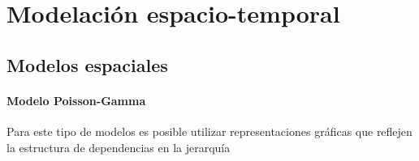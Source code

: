 \chapter{Modelación espacio-temporal} \label{chap:modeling}

\section{Modelos espaciales} \label{sec:spatial_models}

\subsubsection{Modelo Poisson-Gamma} \label{subsubsec:bayesian_poisson_gamma}

Para este tipo de modelos es posible utilizar representaciones gráficas que reflejen la estructura de dependencias en la jerarquía

